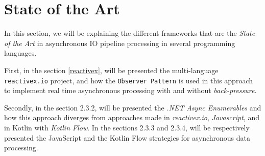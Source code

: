 

\section{State of the Art} %
\label{sec:state_of_the_art}

In this section, we will be explaining the different frameworks that are the \textit{State of the Art} in asynchronous IO pipeline processing in several programming languages.

First, in the section \ref{reactivex}, will be presented the multi-language \texttt{reactivex.io} project, and how the \texttt{Observer Pattern} is used in this approach to implement real time asynchronous processing with and without \textit{back-pressure}.

Secondly, in the section 2.3.2, will be presented the \textit{.NET} \textit{Async Enumerables} and how this approach diverges from approaches made in \textit{reactivex.io}, \textit{Javascript}, and in Kotlin with \textit{Kotlin Flow}.
In the sections 2.3.3 and 2.3.4, will be respectively presented the JavaScript and the Kotlin Flow strategies for asynchronous data processing.

